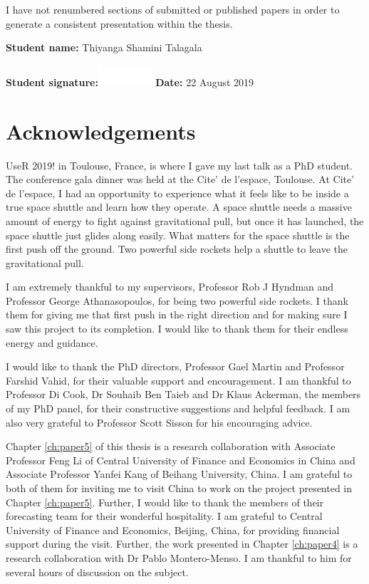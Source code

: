 \documentclass{monashthesis}
\begin{document}
\newpage

I have not renumbered sections of submitted or published papers in order to generate a consistent presentation within the thesis.

\textbf{Student name:} Thiyanga Shamini Talagala
\vspace{-0.15cm}

\textbf{Student signature:}\includegraphics[width=0.15\textwidth]{img0000.png} \hspace{5cm}\textbf{Date:} 22 August 2019

\hypertarget{acknowledgements}{%
\chapter*{Acknowledgements}\label{acknowledgements}}

UseR 2019! in Toulouse, France, is where I gave my last talk as a PhD student. The conference gala dinner was held at the Cite' de l'espace, Toulouse. At Cite' de l'espace, I had an opportunity to experience what it feels like to be inside a true space shuttle and learn how they operate. A space shuttle needs a massive amount of energy to fight against gravitational pull, but once it has launched, the space shuttle just glides along easily. What matters for the space shuttle is the first push off the ground. Two powerful side rockets help a shuttle to leave the gravitational pull.

I am extremely thankful to my supervisors, Professor Rob J Hyndman and Professor George Athanasopoulos, for being two powerful side rockets. I thank them for giving me that first push in the right direction and for making sure I saw this project to its completion. I would like to thank them for their endless energy and guidance.

I would like to thank the PhD directors, Professor Gael Martin and Professor Farshid Vahid, for their valuable support and encouragement. I am thankful to Professor Di Cook, Dr Souhaib Ben Taieb and Dr Klaus Ackerman, the members of my PhD panel, for their constructive suggestions and helpful feedback. I am also very grateful to Professor Scott Sisson for his encouraging advice.

Chapter \ref{ch:paper5} of this thesis is a research collaboration with Associate Professor Feng Li of Central University of Finance and Economics in China and Associate Professor Yanfei Kang of Beihang University, China. I am grateful to both of them for inviting me to visit China to work on the project presented in Chapter \ref{ch:paper5}. Further, I would like to thank the members of their forecasting team for their wonderful hospitality. I am grateful to Central University of Finance and Economics, Beijing, China, for providing financial support during the visit. Further, the work presented in Chapter \ref{ch:paper4} is a research collaboration with Dr Pablo Montero-Menso. I am thankful to him for several hours of discussion on the subject.
\end{document}
